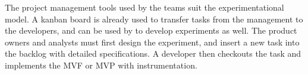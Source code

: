 \documentclass[english]{tktltiki2}
\theoremstyle{definition}
\theoremstyle{remark}
\begin{document}
The project management tools used by the teams suit the experimentational model. A kanban board is already used to transfer tasks from the management to the developers, and can be used by to develop experiments as well. The product owners and analysts must first design the experiment, and insert a new task into the backlog with detailed specifications. A developer then checkouts the task and implements the MVF or MVP with instrumentation. 


\end{document}
